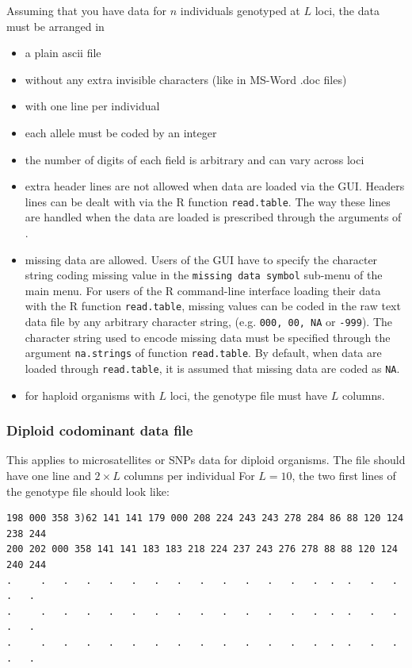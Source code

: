 \documentclass[a4paper,10pt]{article}
\begin{document}
Assuming that you have data for $n$  individuals  genotyped at $L$ loci, 
the data must be arranged in 
\begin{itemize}
\item a plain ascii file 
\item without any extra invisible characters (like in MS-Word .doc files)
\item with one line per individual
\item each allele must be coded by an integer
\item the number of digits of each field is arbitrary and can vary across loci
\item extra header lines are not allowed when data are loaded via the GUI. 
Headers lines can be dealt with via the R function \texttt{read.table}. 
 The way these lines are handled when the data are loaded is prescribed 
through the arguments of .
\item missing data  are allowed. 
Users of the GUI have to specify the character string coding missing value in the \texttt{missing data symbol} sub-menu 
of the main menu. 
For users of the R command-line interface loading their data with the R function \texttt{read.table}, 
missing values can be coded in the raw text data file by any arbitrary character string, 
(e.g. {\tt000, 00, NA} or {\tt -999}). 
The character string used to encode missing data must be specified through the argument \texttt{na.strings} 
of function \texttt{read.table}. By default, when data are loaded through \texttt{read.table}, 
it is assumed that missing data 
are coded as {\tt NA}.
\item for haploid organisms with $L$ loci, the genotype file must have $L$ columns.
\end{itemize}

\subsubsection{Diploid codominant data file}

This applies to microsatellites or SNPs data for diploid organisms.
The file should have one line and $2\times L$ columns per individual
For $L=10$, the two first lines of the genotype file should look like:\\

\medskip
\begin{verbatim}
198 000 358 3)62 141 141 179 000 208 224 243 243 278 284 86 88 120 124 238 244
200 202 000 358 141 141 183 183 218 224 237 243 276 278 88 88 120 124 240 244
.     .   .   .   .   .   .   .   .   .   .   .   .   .  .  .   .   .   .   .
.     .   .   .   .   .   .   .   .   .   .   .   .   .  .  .   .   .   .   .
.     .   .   .   .   .   .   .   .   .   .   .   .   .  .  .   .   .   .   .
\end{verbatim}
\end{document}

